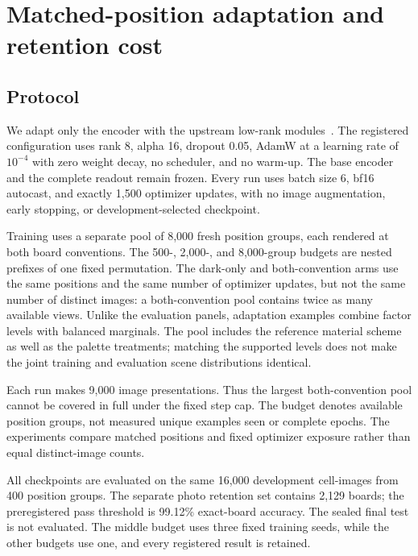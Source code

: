 \section{Matched-position adaptation and retention cost}
\label{sec:adaptation}

\subsection{Protocol}

We adapt only the encoder with the upstream low-rank modules~\citep{lora,chessqueries}. The registered
configuration uses rank 8, alpha 16, dropout 0.05, AdamW at a learning rate of
$10^{-4}$ with zero weight decay, no scheduler, and no warm-up. The base
encoder and the complete readout remain frozen. Every run uses batch size 6,
bf16 autocast, and exactly 1,500 optimizer updates, with no image augmentation,
early stopping, or development-selected checkpoint.

Training uses a separate pool of 8,000 fresh position groups, each rendered at
both board conventions. The 500-, 2,000-, and 8,000-group budgets are nested
prefixes of one fixed permutation. The dark-only and both-convention arms use
the same positions and the same number of optimizer updates, but not the same
number of distinct images: a both-convention pool contains twice as many
available views. Unlike the evaluation panels, adaptation examples combine factor
levels with balanced marginals. The pool includes the reference material scheme
as well as the palette treatments; matching the supported levels does not make
the joint training and evaluation scene distributions identical.

Each run makes 9,000 image presentations. Thus the largest both-convention pool
cannot be covered in full under the fixed step cap. The budget denotes available
position groups, not measured unique examples seen or complete epochs. The
experiments compare matched positions and fixed optimizer exposure rather than
equal distinct-image counts.

All checkpoints are evaluated on the same 16,000 development cell-images from
400 position groups. The separate photo retention set contains 2,129 boards;
the preregistered pass threshold is 99.12\% exact-board accuracy. The sealed
final test is not evaluated. The middle budget uses three fixed training seeds,
while the other budgets use one, and every registered result is retained.

